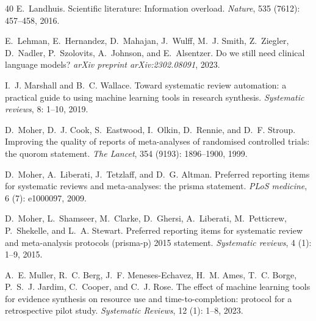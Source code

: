 \documentclass{article}
\begin{document}
\begin{thebibliography}{40}
E.~Landhuis.
\newblock Scientific literature: Information overload.
\newblock \emph{Nature}, 535 (7612): 457--458, 2016.

E.~Lehman, E.~Hernandez, D.~Mahajan, J.~Wulff, M.~J. Smith, Z.~Ziegler,
  D.~Nadler, P.~Szolovits, A.~Johnson, and E.~Alsentzer.
\newblock Do we still need clinical language models?
\newblock \emph{arXiv preprint arXiv:2302.08091}, 2023.

I.~J. Marshall and B.~C. Wallace.
\newblock Toward systematic review automation: a practical guide to using
  machine learning tools in research synthesis.
\newblock \emph{Systematic reviews}, 8: 1--10, 2019.

D.~Moher, D.~J. Cook, S.~Eastwood, I.~Olkin, D.~Rennie, and D.~F. Stroup.
\newblock Improving the quality of reports of meta-analyses of randomised
  controlled trials: the quorom statement.
\newblock \emph{The Lancet}, 354 (9193): 1896--1900, 1999.

D.~Moher, A.~Liberati, J.~Tetzlaff, and D.~G. Altman.
\newblock Preferred reporting items for systematic reviews and meta-analyses:
  the prisma statement.
\newblock \emph{PLoS medicine}, 6 (7): e1000097, 2009.

D.~Moher, L.~Shamseer, M.~Clarke, D.~Ghersi, A.~Liberati, M.~Petticrew,
  P.~Shekelle, and L.~A. Stewart.
\newblock Preferred reporting items for systematic review and meta-analysis
  protocols (prisma-p) 2015 statement.
\newblock \emph{Systematic reviews}, 4 (1): 1--9, 2015.

A.~E. Muller, R.~C. Berg, J.~F. Meneses-Echavez, H.~M. Ames, T.~C. Borge,
  P.~S.~J. Jardim, C.~Cooper, and C.~J. Rose.
\newblock The effect of machine learning tools for evidence synthesis on
  resource use and time-to-completion: protocol for a retrospective pilot
  study.
\newblock \emph{Systematic Reviews}, 12 (1): 1--8, 2023.


\end{thebibliography}
\end{document}

